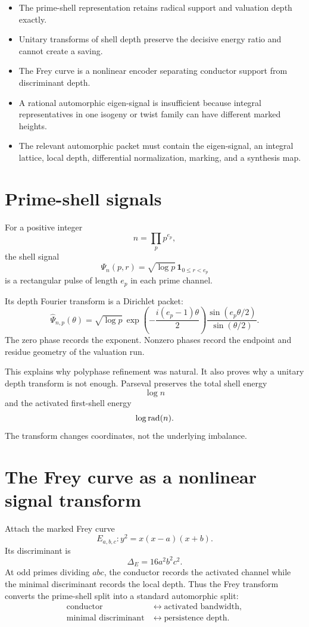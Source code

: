 \begin{itemize}[leftmargin=1.5em]
\item The prime-shell representation retains radical support and valuation depth exactly.
\item Unitary transforms of shell depth preserve the decisive energy ratio and cannot create a saving.
\item The Frey curve is a nonlinear encoder separating conductor support from discriminant depth.
\item A rational automorphic eigen-signal is insufficient because integral representatives in one isogeny or twist family can have different marked heights.
\item The relevant automorphic packet must contain the eigen-signal, an integral lattice, local depth, differential normalization, marking, and a synthesis map.
\end{itemize}

\section{Prime-shell signals}
For a positive integer
\[
n=\prod_pp^{e_p},
\]
the shell signal
\[
\Psi_n(p,r)=\sqrt{\log p}\,\mathbf1_{0\le r<e_p}
\]
is a rectangular pulse of length $e_p$ in each prime channel.

Its depth Fourier transform is a Dirichlet packet:
\[
\widehat\Psi_{n,p}(\theta)
=
\sqrt{\log p}\,
\exp\left(-\frac{i(e_p-1)\theta}{2}\right)
\frac{\sin(e_p\theta/2)}{\sin(\theta/2)}.
\]
The zero phase records the exponent. Nonzero phases record the endpoint and residue geometry of the valuation run.

This explains why polyphase refinement was natural. It also proves why a unitary depth transform is not enough. Parseval preserves the total shell energy
\[
\log n
\]
and the activated first-shell energy
\[
\log\operatorname{rad}(n).
\]
The transform changes coordinates, not the underlying imbalance.

\section{The Frey curve as a nonlinear signal transform}
Attach the marked Frey curve
\[
E_{a,b,c}:y^2=x(x-a)(x+b).
\]
Its discriminant is
\[
\Delta_E=16a^2b^2c^2.
\]
At odd primes dividing $abc$, the conductor records the activated channel while the minimal discriminant records the local depth. Thus the Frey transform converts the prime-shell split into a standard automorphic split:
\[
\begin{aligned}
\text{conductor}
&\longleftrightarrow
\text{activated bandwidth},\\
\text{minimal discriminant}
&\longleftrightarrow
\text{persistence depth}.
\end{aligned}
\]

